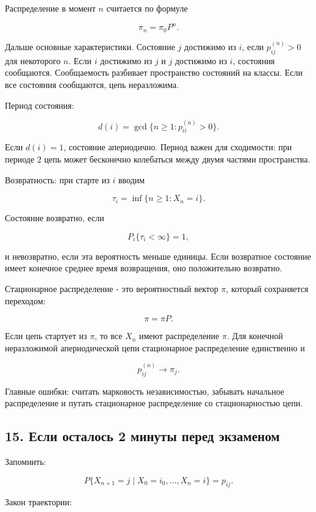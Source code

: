 \documentclass[
  11pt,
  a4paper,
]{article}
\begin{document}
Распределение в момент \(n\) считается по формуле

\[
\pi_n=\pi_0P^n.
\]

Дальше основные характеристики. Состояние \(j\) достижимо из \(i\), если
\(p_{ij}^{(n)}>0\) для некоторого \(n\). Если \(i\) достижимо из \(j\) и
\(j\) достижимо из \(i\), состояния сообщаются. Сообщаемость разбивает
пространство состояний на классы. Если все состояния сообщаются, цепь
неразложима.

Период состояния:

\[
d(i)=\gcd\{n\ge1:p_{ii}^{(n)}>0\}.
\]

Если \(d(i)=1\), состояние апериодично. Период важен для сходимости: при
периоде \(2\) цепь может бесконечно колебаться между двумя частями
пространства.

Возвратность: при старте из \(i\) вводим

\[
\tau_i=\inf\{n\ge1:X_n=i\}.
\]

Состояние возвратно, если

\[
P_i\{\tau_i<\infty\}=1,
\]

и невозвратно, если эта вероятность меньше единицы. Если возвратное
состояние имеет конечное среднее время возвращения, оно положительно
возвратно.

Стационарное распределение - это вероятностный вектор \(\pi\), который
сохраняется переходом:

\[
\pi=\pi P.
\]

Если цепь стартует из \(\pi\), то все \(X_n\) имеют распределение
\(\pi\). Для конечной неразложимой апериодической цепи стационарное
распределение единственно и

\[
p_{ij}^{(n)}\to\pi_j.
\]

Главные ошибки: считать марковость независимостью, забывать начальное
распределение и путать стационарное распределение со стационарностью
цепи.

\subsection{15. Если осталось 2 минуты перед
экзаменом}\label{ux435ux441ux43bux438-ux43eux441ux442ux430ux43bux43eux441ux44c-2-ux43cux438ux43dux443ux442ux44b-ux43fux435ux440ux435ux434-ux44dux43aux437ux430ux43cux435ux43dux43eux43c}

Запомнить:

\[
P\{X_{n+1}=j\mid X_0=i_0,\ldots,X_n=i\}
=p_{ij}.
\]

Закон траектории:
\end{document}
